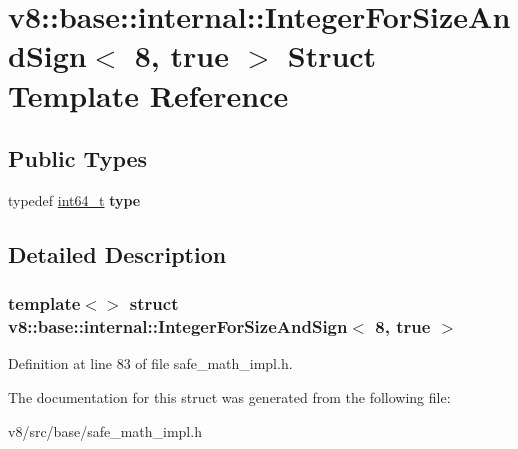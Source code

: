 \hypertarget{structv8_1_1base_1_1internal_1_1IntegerForSizeAndSign_3_018_00_01true_01_4}{}\section{v8\+:\+:base\+:\+:internal\+:\+:Integer\+For\+Size\+And\+Sign$<$ 8, true $>$ Struct Template Reference}
\label{structv8_1_1base_1_1internal_1_1IntegerForSizeAndSign_3_018_00_01true_01_4}
\subsection*{Public Types}
\begin{DoxyCompactItemize}
\item 
\mbox{\label{structv8_1_1base_1_1internal_1_1IntegerForSizeAndSign_3_018_00_01true_01_4_a36eba77a5bfacf6f64652b9687fa0c5e}} 
typedef \mbox{\hyperlink{classint64__t}{int64\+\_\+t}} {\bfseries type}
\end{DoxyCompactItemize}


\subsection{Detailed Description}
\subsubsection*{template$<$$>$\newline
struct v8\+::base\+::internal\+::\+Integer\+For\+Size\+And\+Sign$<$ 8, true $>$}



Definition at line 83 of file safe\+\_\+math\+\_\+impl.\+h.



The documentation for this struct was generated from the following file\+:\begin{DoxyCompactItemize}
\item 
v8/src/base/safe\+\_\+math\+\_\+impl.\+h\end{DoxyCompactItemize}
